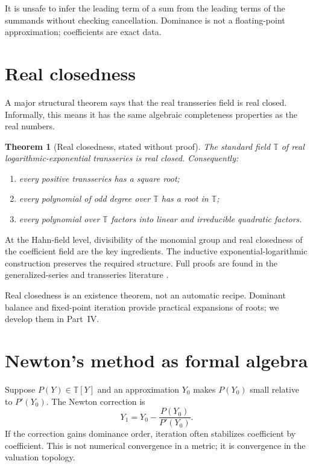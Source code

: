 \documentclass[11pt,openany]{book}
\theoremstyle{definition}
\theoremstyle{plain}
\newtheorem{theorem}{Theorem}[chapter]
\theoremstyle{remark}
\newcommand{\T}{\mathbb{T}}
\begin{document}
\begin{warningbox}
It is unsafe to infer the leading term of a sum from the leading terms of the summands without checking cancellation. Dominance is not a floating-point approximation; coefficients are exact data.
\end{warningbox}

\section{Real closedness}

A major structural theorem says that the real transseries field is real closed. Informally, this means it has the same algebraic completeness properties as the real numbers.

\begin{theorem}[Real closedness, stated without proof]\label{thm:real-closed}
The standard field $\T$ of real logarithmic-exponential transseries is real closed. Consequently:
\begin{enumerate}
\item every positive transseries has a square root;
\item every polynomial of odd degree over $\T$ has a root in $\T$;
\item every polynomial over $\T$ factors into linear and irreducible quadratic factors.
\end{enumerate}
\end{theorem}

At the Hahn-field level, divisibility of the monomial group and real closedness of the coefficient field are the key ingredients. The inductive exponential-logarithmic construction preserves the required structure. Full proofs are found in the generalized-series and transseries literature \cite{vdDMM-1997,vdDMM-2001,vdhoeven-book}.

Real closedness is an existence theorem, not an automatic recipe. Dominant balance and fixed-point iteration provide practical expansions of roots; we develop them in Part~IV.

\section{Newton's method as formal algebra}

Suppose $P(Y)\in\T[Y]$ and an approximation $Y_0$ makes $P(Y_0)$ small relative to $P'(Y_0)$. The Newton correction is
\[
 Y_1=Y_0-\frac{P(Y_0)}{P'(Y_0)}.
\]
If the correction gains dominance order, iteration often stabilizes coefficient by coefficient. This is not numerical convergence in a metric; it is convergence in the valuation topology.
\end{document}
